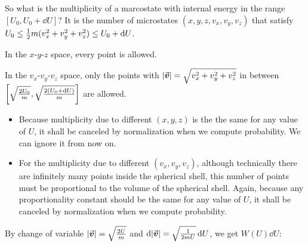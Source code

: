 \documentclass[class=article, crop=false, 12pt]{standalone}
\begin{document}
So what is the multiplicity of a marcostate with internal energy in the range $[U_0,U_0+\dd{U}]$?
It is the number of microstates $(x,y,z, v_x,v_y,v_z)$ that satisfy $U_0\leq \frac{1}{2} m(v_x^2+v_y^2+v_z^2)\leq U_0+\dd{U}$.


In the $x$-$y$-$z$ space, every point is allowed. 

In the $v_x$-$v_y$-$v_z$ space, 
only the points with $|\va*{v}| = \sqrt{v_x^2+v_y^2+v_z^2}$ in between $\qty[\sqrt{\frac{2U_0}{m}}, \sqrt{\frac{2(U_0+\dd{U})}{m}}]$ are allowed.\\

\begin{itemize}
    \item Because multiplicity due to different $(x,y,z)$ is the the same for any value of $U$,
    it shall be canceled by normalization when we compute probability.
    We can ignore it from now on.

    \item For the multiplicity due to different $(v_x,v_y,v_z)$,
    although technically there are infinitely many points inside the spherical shell,
    this number of points must be proportional to the volume of the spherical shell.
    Again, because any proportionality constant should be the same for any value of $U$, 
    it shall be canceled by normalization when we compute probability.

\end{itemize}

By change of variable $|\va*{v}| = \sqrt{\frac{2U}{m}}$ and $\dd{|\va*{v}|} = \sqrt{\frac{1}{2mU}}\dd{U}$,
we get $W(U)\dd{U}$:
\end{document}
